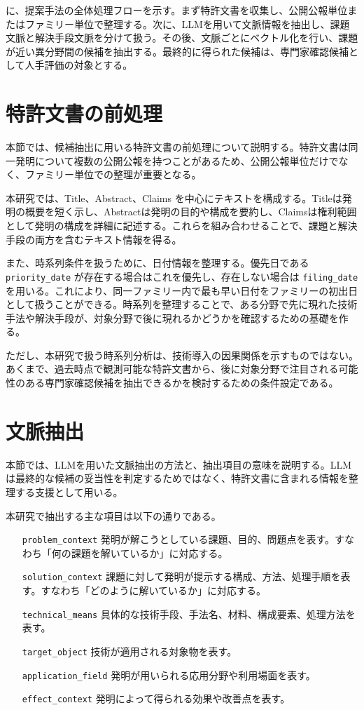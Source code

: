 に、提案手法の全体処理フローを示す。まず特許文書を収集し、公開公報単位またはファミリー単位で整理する。次に、LLMを用いて文脈情報を抽出し、課題文脈と解決手段文脈を分けて扱う。その後、文脈ごとにベクトル化を行い、課題が近い異分野間の候補を抽出する。最終的に得られた候補は、専門家確認候補として人手評価の対象とする。

\section{特許文書の前処理}

本節では、候補抽出に用いる特許文書の前処理について説明する。特許文書は同一発明について複数の公開公報を持つことがあるため、公開公報単位だけでなく、ファミリー単位での整理が重要となる。

本研究では、Title、Abstract、Claims を中心にテキストを構成する。Titleは発明の概要を短く示し、Abstractは発明の目的や構成を要約し、Claimsは権利範囲として発明の構成を詳細に記述する。これらを組み合わせることで、課題と解決手段の両方を含むテキスト情報を得る。

また、時系列条件を扱うために、日付情報を整理する。優先日である \texttt{priority\_date} が存在する場合はこれを優先し、存在しない場合は \texttt{filing\_date} を用いる。これにより、同一ファミリー内で最も早い日付をファミリーの初出日として扱うことができる。時系列を整理することで、ある分野で先に現れた技術手法や解決手段が、対象分野で後に現れるかどうかを確認するための基礎を作る。

ただし、本研究で扱う時系列分析は、技術導入の因果関係を示すものではない。あくまで、過去時点で観測可能な特許文書から、後に対象分野で注目される可能性のある専門家確認候補を抽出できるかを検討するための条件設定である。

\section{文脈抽出}




本節では、LLMを用いた文脈抽出の方法と、抽出項目の意味を説明する。LLMは最終的な候補の妥当性を判定するためではなく、特許文書に含まれる情報を整理する支援として用いる。

本研究で抽出する主な項目は以下の通りである。

\begin{itemize}
\item[\texttt{problem\_context}] 発明が解こうとしている課題、目的、問題点を表す。すなわち「何の課題を解いているか」に対応する。
\item[\texttt{solution\_context}] 課題に対して発明が提示する構成、方法、処理手順を表す。すなわち「どのように解いているか」に対応する。
\item[\texttt{technical\_means}] 具体的な技術手段、手法名、材料、構成要素、処理方法を表す。
\item[\texttt{target\_object}] 技術が適用される対象物を表す。
\item[\texttt{application\_field}] 発明が用いられる応用分野や利用場面を表す。
\item[\texttt{effect\_context}] 発明によって得られる効果や改善点を表す。
\end{itemize}

